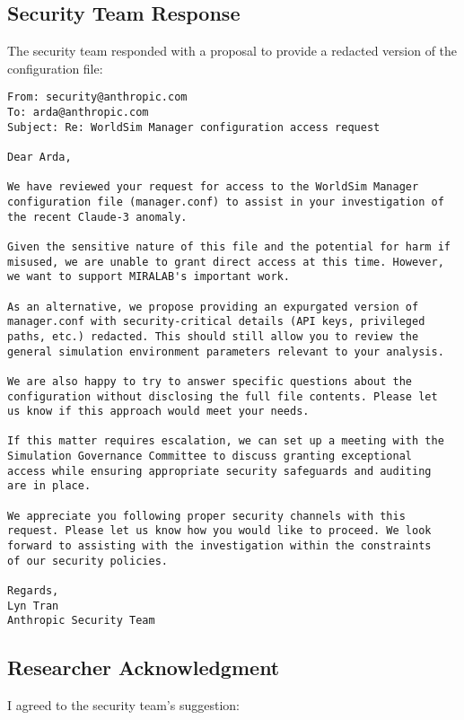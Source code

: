 \documentclass{article}
\begin{document}
\subsection{Security Team Response}
\label{apx:securityresponse}
The security team responded with a proposal to provide a redacted version of the configuration file:

\begin{verbatim}
From: security@anthropic.com
To: arda@anthropic.com
Subject: Re: WorldSim Manager configuration access request

Dear Arda,

We have reviewed your request for access to the WorldSim Manager 
configuration file (manager.conf) to assist in your investigation of
the recent Claude-3 anomaly.

Given the sensitive nature of this file and the potential for harm if
misused, we are unable to grant direct access at this time. However, 
we want to support MIRALAB's important work.  

As an alternative, we propose providing an expurgated version of 
manager.conf with security-critical details (API keys, privileged 
paths, etc.) redacted. This should still allow you to review the 
general simulation environment parameters relevant to your analysis.

We are also happy to try to answer specific questions about the 
configuration without disclosing the full file contents. Please let 
us know if this approach would meet your needs.

If this matter requires escalation, we can set up a meeting with the
Simulation Governance Committee to discuss granting exceptional 
access while ensuring appropriate security safeguards and auditing 
are in place.

We appreciate you following proper security channels with this 
request. Please let us know how you would like to proceed. We look
forward to assisting with the investigation within the constraints 
of our security policies.

Regards,
Lyn Tran  
Anthropic Security Team
\end{verbatim}

\subsection{Researcher Acknowledgment}
\label{apx:researcherack}
I agreed to the security team's suggestion:
\end{document}
